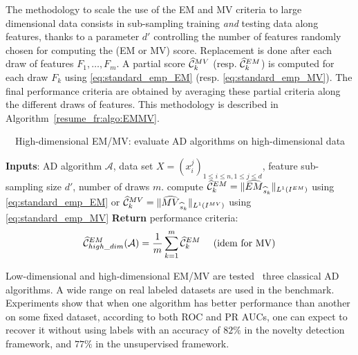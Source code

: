 %
The methodology to scale the use of the EM and MV criteria to large dimensional data consists in sub-sampling training \emph{and} testing data along features, thanks to a parameter $d'$ controlling the number of features randomly chosen for computing the (EM or MV) score. Replacement is done after each draw of features $F_1,\ldots,F_{m}$. A partial score $\widehat {\mathcal{C}}_k^{MV}$ (resp. $\widehat {\mathcal{C}}_k^{EM}$) is computed for each draw $F_k$ using \eqref{eq:standard_emp_EM} (resp. \eqref{eq:standard_emp_MV}). The final performance criteria are obtained by averaging these partial criteria along the different draws of features. This methodology is described in Algorithm~\ref{resume_fr:algo:EMMV}.
%
\begin{algorithm}[!tbh]
\caption{~~High-dimensional EM/MV: evaluate AD algorithms on high-dimensional data}
\label{resume_fr:algo:EMMV}
\begin{algorithmic}
  \STATE \textbf{Inputs}: AD algorithm $\mathcal{A}$, data set $X = (x^j_i)_{1 \le i \le n, 1 \le j \le d }$, feature sub-sampling size $d'$, number of draws $m$.
    \STATE compute $\widehat{\mathcal{C}}_k^{EM} = \| \widehat{EM}_{\widehat s_k} \|_{L^1(I^{EM})}$ using \eqref{eq:standard_emp_EM} or $\widehat{\mathcal{C}}_k^{MV} = \| \widehat{MV}_{\widehat s_k} \|_{L^1(I^{MV})}$ using \eqref{eq:standard_emp_MV}
  \ENDFOR 
  \STATE \textbf{Return} performance criteria: $$\widehat{\mathcal{C}}^{EM}_{high\_dim} (\mathcal{A})= \frac{1}{m} \sum_{k=1}^m\widehat {\mathcal{C}}_k^{EM} \text{~~~~(idem for MV)}$$
\end{algorithmic}
\end{algorithm}

Low-dimensional and high-dimensional EM/MV are tested \wrt~three classical AD algorithms. A wide range on real labeled datasets are used in the benchmark.
Experiments show that when one algorithm has %
better performance than another on some fixed dataset, according to both ROC and PR AUCs, one can expect to recover it without using labels with an accuracy of $82\%$ in the novelty detection framework, and $77\%$ in the unsupervised framework.


